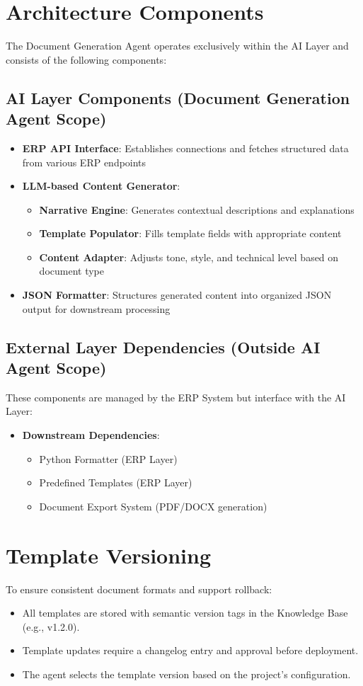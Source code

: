 \documentclass[12pt]{report}
\begin{document}
\section{Architecture Components}
The Document Generation Agent operates exclusively within the AI Layer and consists of the following components:

\subsection{AI Layer Components (Document Generation Agent Scope)}
\begin{itemize}
  \item \textbf{ERP API Interface}: Establishes connections and fetches structured data from various ERP endpoints
  \item \textbf{LLM-based Content Generator}:
    \begin{itemize}
      \item \textbf{Narrative Engine}: Generates contextual descriptions and explanations
      \item \textbf{Template Populator}: Fills template fields with appropriate content
      \item \textbf{Content Adapter}: Adjusts tone, style, and technical level based on document type
    \end{itemize}
  \item \textbf{JSON Formatter}: Structures generated content into organized JSON output for downstream processing
\end{itemize}

\subsection{External Layer Dependencies (Outside AI Agent Scope)}
These components are managed by the ERP System but interface with the AI Layer:
\begin{itemize}
  \item \textbf{Downstream Dependencies}:
    \begin{itemize}
      \item Python Formatter (ERP Layer)
      \item Predefined Templates (ERP Layer)
      \item Document Export System (PDF/DOCX generation)
    \end{itemize}
\end{itemize}

\section{Template Versioning}
To ensure consistent document formats and support rollback:
\begin{itemize}
  \item All templates are stored with semantic version tags in the Knowledge Base (e.g., v1.2.0).
  \item Template updates require a changelog entry and approval before deployment.
  \item The agent selects the template version based on the project’s configuration.
\end{itemize}
\end{document}
